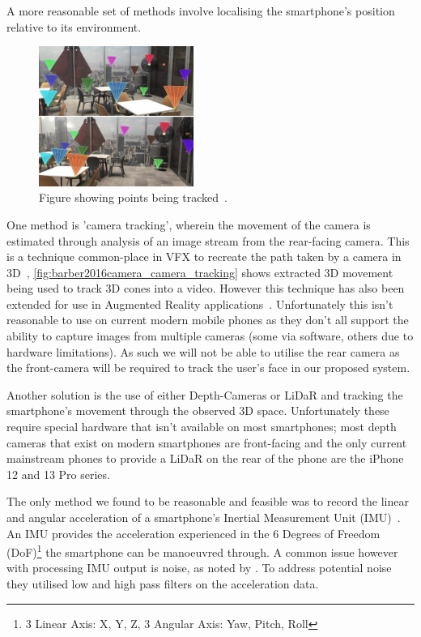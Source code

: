 A more reasonable set of methods involve localising the smartphone's position relative to its environment.
\begin{figure}
    \centering
    \includegraphics[width=0.45\textwidth]{figures/CameraTracking.png}
    \caption{\label{fig:barber2016camera_camera_tracking}Figure showing points being tracked~\cite{barber2016camera}.}
\end{figure}
One method is 'camera tracking', wherein the movement of the camera is estimated through analysis of an image stream from the rear-facing camera. This is a technique common-place in VFX to recreate the path taken by a camera in 3D~\cite{barber2016camera}, \autoref{fig:barber2016camera_camera_tracking} shows extracted 3D movement being used to track 3D cones into a video. However this technique has also been extended for use in Augmented Reality applications~\cite{jiang2000camera}.
Unfortunately this isn't reasonable to use on current modern mobile phones as they don't all support the ability to capture images from multiple cameras (some via software, others due to hardware limitations). As such we will not be able to utilise the rear camera as the front-camera will be required to track the user's face in our proposed system.

Another solution is the use of either Depth-Cameras or LiDaR and tracking the smartphone's movement through the observed 3D space.
Unfortunately these require special hardware that isn't available on most smartphones; most depth cameras that exist on modern smartphones are front-facing and the only current mainstream phones to provide a LiDaR on the rear of the phone are the iPhone 12 and 13 Pro series.

The only method we found to be reasonable and feasible was to record the linear and angular acceleration of a smartphone's Inertial Measurement Unit (IMU)~\cite{mantyla2000hand, kratz2013combining, neelasagar2015real, garcia2014contextualized}. 
An IMU provides the acceleration experienced in the 6 Degrees of Freedom (DoF)\footnote{3 Linear Axis: X, Y, Z, 3 Angular Axis: Yaw, Pitch, Roll} the smartphone can be manoeuvred through.
A common issue however with processing IMU output is noise, as noted by \citeauthor{neelasagar2015real}. To address potential noise they utilised low and high pass filters on the acceleration data. 

